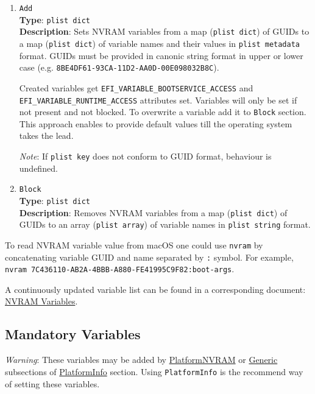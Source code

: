 \documentclass[]{article}
\begin{document}
\begin{enumerate}
\item
  \texttt{Add}\\
  \textbf{Type}: \texttt{plist\ dict}\\
  \textbf{Description}: Sets NVRAM variables from a map (\texttt{plist\ dict})
  of GUIDs to a map (\texttt{plist\ dict}) of variable names and their values
  in \texttt{plist\ metadata} format. GUIDs must be provided in canonic string
  format in upper or lower case (e.g. \texttt{8BE4DF61-93CA-11D2-AA0D-00E098032B8C}).

  Created variables get \texttt{EFI\_VARIABLE\_BOOTSERVICE\_ACCESS} and
  \texttt{EFI\_VARIABLE\_RUNTIME\_ACCESS} attributes set.
  Variables will only be set if not present and not blocked.
  To overwrite a variable add it to \texttt{Block} section. This approach
  enables to provide default values till the operating system takes the lead.

  \emph{Note}: If \texttt{plist\ key} does not conform to GUID format,
  behaviour is undefined.

\item
  \texttt{Block}\\
  \textbf{Type}: \texttt{plist\ dict}\\
  \textbf{Description}: Removes NVRAM variables from a map (\texttt{plist\ dict})
  of GUIDs to an array (\texttt{plist\ array}) of variable names in
  \texttt{plist\ string} format.

\end{enumerate}

To read NVRAM variable value from macOS one could use \texttt{nvram}
by concatenating variable GUID and name separated by \texttt{:} symbol.
For example, \texttt{nvram 7C436110-AB2A-4BBB-A880-FE41995C9F82:boot-args}.

A continuously updated variable list can be found in a corresponding document:
\href{https://docs.google.com/spreadsheets/d/1HTCBwfOBkXsHiK7os3b2CUc6k68axdJYdGl-TyXqLu0}{NVRAM Variables}.

\subsection{Mandatory Variables}\label{nvramvars}

\emph{Warning}: These variables may be added by
\hyperref[platforminfonvram]{PlatformNVRAM} or
\hyperref[platforminfogeneric]{Generic} subsections of
\hyperref[platforminfo]{PlatformInfo} section.
Using \texttt{PlatformInfo} is the recommend way of setting these variables.
\end{document}

